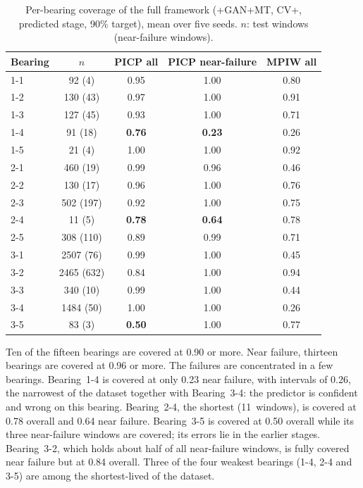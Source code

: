 \documentclass[review]{elsarticle}
\begin{document}
\begin{table}[htbp]
\centering
\caption{Per-bearing coverage of the full framework (+GAN+MT, CV+,
predicted stage, 90\% target), mean over five seeds. $n$: test windows
(near-failure windows).}
\label{tab:per_bearing}
\footnotesize
\renewcommand{\arraystretch}{1.15}
\begin{tabular}{lcccc}
\toprule
\textbf{Bearing} & \textbf{$n$} & \textbf{PICP all} &
\textbf{PICP near-failure} & \textbf{MPIW all} \\
\midrule
1-1 & 92 (4)      & 0.95 & 1.00 & 0.80 \\
1-2 & 130 (43)    & 0.97 & 1.00 & 0.91 \\
1-3 & 127 (45)    & 0.93 & 1.00 & 0.71 \\
1-4 & 91 (18)     & \textbf{0.76} & \textbf{0.23} & 0.26 \\
1-5 & 21 (4)      & 1.00 & 1.00 & 0.92 \\
2-1 & 460 (19)    & 0.99 & 0.96 & 0.46 \\
2-2 & 130 (17)    & 0.96 & 1.00 & 0.76 \\
2-3 & 502 (197)   & 0.92 & 1.00 & 0.75 \\
2-4 & 11 (5)      & \textbf{0.78} & \textbf{0.64} & 0.78 \\
2-5 & 308 (110)   & 0.89 & 0.99 & 0.71 \\
3-1 & 2507 (76)   & 0.99 & 1.00 & 0.45 \\
3-2 & 2465 (632)  & 0.84 & 1.00 & 0.94 \\
3-3 & 340 (10)    & 0.99 & 1.00 & 0.44 \\
3-4 & 1484 (50)   & 1.00 & 1.00 & 0.26 \\
3-5 & 83 (3)      & \textbf{0.50} & 1.00 & 0.77 \\
\bottomrule
\end{tabular}
\end{table}

Ten of the fifteen bearings are covered at 0.90 or more. Near failure,
thirteen bearings are covered at 0.96 or more. The failures are
concentrated in a few bearings. Bearing~1-4 is covered at only 0.23
near failure, with intervals of 0.26, the narrowest of the dataset
together with Bearing~3-4: the predictor is confident and wrong on
this bearing. Bearing~2-4, the shortest (11~windows), is covered at
0.78 overall and 0.64 near failure. Bearing~3-5 is covered at 0.50
overall while its three near-failure windows are covered; its errors
lie in the earlier stages. Bearing~3-2, which holds about half of all
near-failure windows, is fully covered near failure but at 0.84 overall.
Three of the four weakest bearings (1-4, 2-4 and 3-5) are among the
shortest-lived of the dataset.\\
\end{document}
